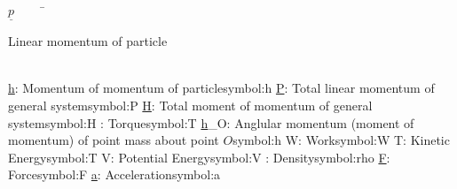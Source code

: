 \begin{tabbing}
  $\underline{p}$~~~~~\=\parbox{5in}{Linear momentum of particle}\\
  \addsymbol{}\underline{h}: {Momentum of momentum of particle}{symbol:h}
  \addsymbol{}\underline{P}: {Total linear momentum of general system}{symbol:P}
  \addsymbol{}\underline{H}: {Total moment of momentum of general system}{symbol:H}
  \addsymbol{}\underline{\tau}: {Torque}{symbol:T}
  \addsymbol{}\underline{h}_{O}: {Anglular momentum (moment of momentum) of point mass about point $O$}{symbol:h}
  \addsymbol{}W: {Work}{symbol:W}
  \addsymbol{}T: {Kinetic Energy}{symbol:T}
  \addsymbol{}V: {Potential Energy}{symbol:V}
  \addsymbol{}\rho: {Density}{symbol:rho}
  \addsymbol{}\underline{F}: {Force}{symbol:F}
  \addsymbol{}\underline{a}: {Acceleration}{symbol:a}
\end{tabbing}
